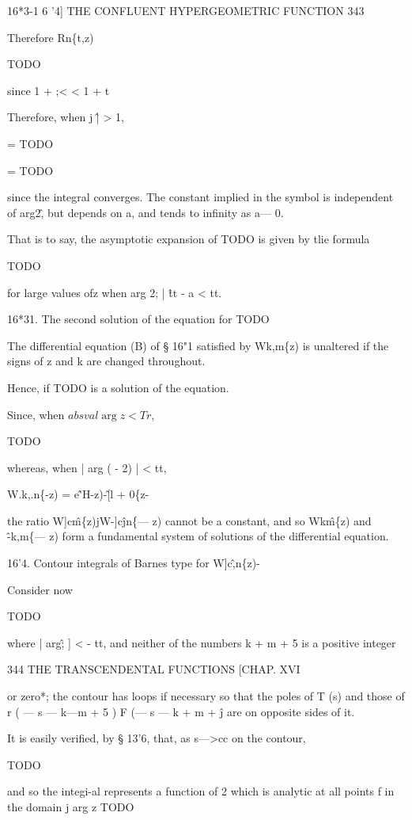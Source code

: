 16*3-1 6 '4] THE CONFLUENT HYPERGEOMETRIC FUNCTION 343 

Therefore 
Rn\{t,z) 

TODO

since 1 + ;< < 1 + t 

Therefore, when j \^ | > 1, 

= TODO

= TODO

since the integral converges. The constant implied in the symbol is 
independent of arg2\^, but depends on a, and tends to infinity as a— 0. 

That is to say, the asymptotic expansion of TODO is given by tlie formula 

TODO

for large values ofz when  arg 2; | \^ tt - a < tt. 

16*31. The second solution of the equation for TODO

The differential equation (B) of § 16"1 satisfied by Wk,m\{z) is unaltered if 
the signs of z and k are changed throughout. 

Hence, if TODO is a solution of the equation. 

Since, when $absval{\arg z} < Tr$, 

TODO

whereas, when | arg ( - 2) | < tt, 

W.k,.n\{-z) = e\^'H-z)-\^[l + 0\{z-%

the ratio W]c\^m\{z)jW-]c\^jn\{— z) cannot be a constant, and so Wk\^m\{z) and 
\^-k,m\{— z) form a fundamental system of solutions of the differential 
equation. 

16'4. Contour integrals of Barnes type for W]c\^,n\{z)- 

Consider now 

TODO

where | arg\^; ] < - tt, and neither of the numbers k + m + 5 is a positive integer 



344 THE TRANSCENDENTAL FUNCTIONS [CHAP. XVI 

or zero*; the contour has loops if necessary so that the poles of T (s) and 
those of r ( — s — k—m + 5 ) F (— s — k + m + \^j are on opposite sides of it. 

It is easily verified, by § 13'6, that, as s—>cc on the contour, 

TODO

and so the integi-al represents a function of 2 which is analytic at all points f 
in the domain j arg z TODO

